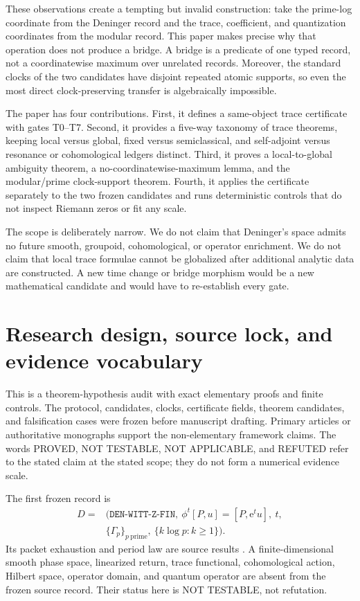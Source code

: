 \documentclass[11pt]{article}
\theoremstyle{definition}
\theoremstyle{remark}
\newcommand{\e}{\mathrm{e}}
\newcommand{\proved}{\textsf{PROVED}\xspace}
\newcommand{\nottest}{\textsf{NOT TESTABLE}\xspace}
\newcommand{\refuted}{\textsf{REFUTED}\xspace}
\newcommand{\notapp}{\textsf{NOT APPLICABLE}\xspace}
\begin{document}
These observations create a tempting but invalid construction: take the
prime-log coordinate from the Deninger record and the trace, coefficient, and
quantization coordinates from the modular record.  This paper makes precise
why that operation does not produce a bridge.  A bridge is a predicate of one
typed record, not a coordinatewise maximum over unrelated records.  Moreover,
the standard clocks of the two candidates have disjoint repeated atomic
supports, so even the most direct clock-preserving transfer is algebraically
impossible.

The paper has four contributions.  First, it defines a same-object trace
certificate with gates T0--T7.  Second, it provides a five-way taxonomy of
trace theorems, keeping local versus global, fixed versus semiclassical, and
self-adjoint versus resonance or cohomological ledgers distinct.  Third, it
proves a local-to-global ambiguity theorem, a no-coordinatewise-maximum lemma,
and the modular/prime clock-support theorem.  Fourth, it applies the
certificate separately to the two frozen candidates and runs deterministic
controls that do not inspect Riemann zeros or fit any scale.

The scope is deliberately narrow.  We do not claim that Deninger's space
admits no future smooth, groupoid, cohomological, or operator enrichment.  We
do not claim that local trace formulae cannot be globalized after additional
analytic data are constructed.  A new time change or bridge morphism would be
a new mathematical candidate and would have to re-establish every gate.

\section{Research design, source lock, and evidence vocabulary}
\label{sec:design}

This is a theorem-hypothesis audit with exact elementary proofs and finite
controls.  The protocol, candidates, clocks, certificate fields, theorem
candidates, and falsification cases were frozen before manuscript drafting.
Primary articles or authoritative monographs support the non-elementary
framework claims.  The words \proved, \nottest, \notapp, and \refuted refer
to the stated claim at the stated scope; they do not form a numerical evidence
scale.

The first frozen record is
\begin{equation*}
\begin{aligned}
 D={}&(\texttt{DEN-WITT-Z-FIN},\ \phi^t[P,u]=[P,\e^t u],\ t,\\
 &\{\Gamma_p\}_{p\ \mathrm{prime}},\ \{k\log p:k\ge1\}).
\end{aligned}
\end{equation*}
Its packet exhaustion and period law are source results
\citep{Deninger2026}.  A finite-dimensional smooth phase space, linearized
return, trace functional, cohomological action, Hilbert space, operator domain,
and quantum operator are absent from the frozen source record.  Their status
here is \nottest, not refutation.
\end{document}
